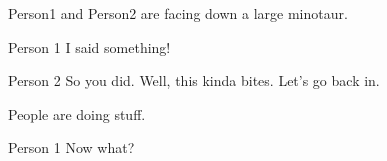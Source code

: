 
Person1 and Person2 are facing down a large minotaur.

\begin{dialogue}{Person 1}  I said something! \end{dialogue}

\begin{dialogue}{Person 2} So you did.  Well, this kinda bites. Let's go back in. \end{dialogue}


People are doing stuff.

\begin{dialogue}{Person 1} Now what? \end{dialogue}

